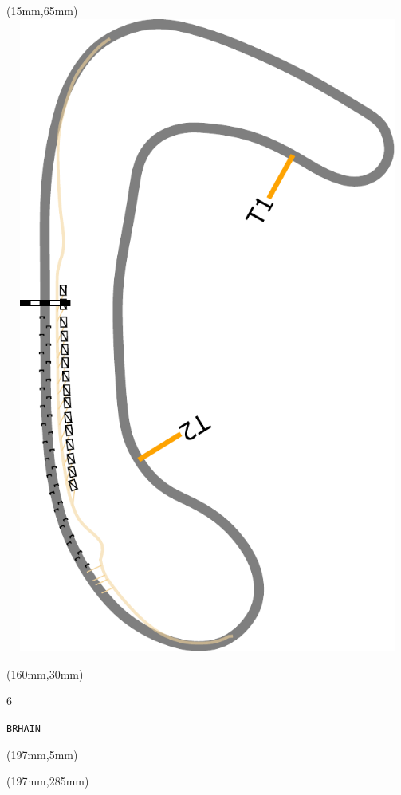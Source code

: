 \begin{textblock*}{185mm}(15mm,65mm)%
\centering
\mbox{\includegraphics[width=185mm,height=210mm,keepaspectratio]{PT/BRHAIN.pdf}}
\end{textblock*}
\begin{textblock*}{40mm}(160mm,30mm)%
\Large
\par{} 
\par6 
\par\hfill\tiny\tt BRHAIN\\
\end{textblock*}
\begin{textblock*}{20mm}(197mm,5mm)%
\fbox{\thepage}
\label{BRHAIN}
\end{textblock*}
\begin{textblock*}{20mm}(197mm,285mm)%
\fbox{\thepage}
\end{textblock*}

